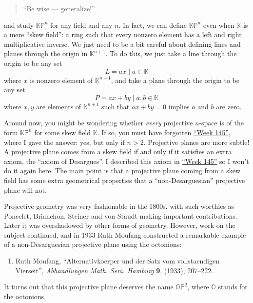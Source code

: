 \documentclass{article}
\def\tightlist{}
\begin{document}
\begin{quote}
``Be wise --- generalize!''
\end{quote}

and study \(\mathbb{KP}^n\) for any field and any \(n\). In fact, we can
define \(\mathbb{KP}^n\) even when \(\mathbb{K}\) is a mere ``skew
field'': a ring such that every nonzero element has a left and right
multiplicative inverse. We just need to be a bit careful about defining
lines and planes through the origin in \(\mathbb{K}^{n+1}\). To do this,
we just take a line through the origin to be any set
\[L = {ax \mid a\in\mathbb{K}}\] where \(x\) is nonzero element of
\(\mathbb{K}^{n+1}\), and take a plane through the origin to be any set
\[P = {ax + by \mid a,b\in\mathbb{K}}\] where \(x,y\) are elements of
\(\mathbb{K}^{n+1}\) such that \(ax + by = 0\) implies \(a\) and \(b\)
are zero.

Around now, you might be wondering whether \emph{every} projective
\(n\)-space is of the form \(\mathbb{KP}^n\) for some skew field
\(\mathbb{K}\). If so, you must have forgotten
\protect\hyperlink{week145}{``Week 145''}, where I gave the answer: yes,
but only if \(n>2\). Projective planes are more subtle! A projective
plane comes from a skew field if and only if it satisfies an extra
axiom, the ``axiom of Desargues''. I described this axiom in
\protect\hyperlink{week145}{``Week 145''} so I won't do it again here.
The main point is that a projective plane coming from a skew field has
some extra geometrical properties that a ``non-Desarguesian'' projective
plane will not.

Projective geometry was very fashionable in the 1800s, with such
worthies as Poncelet, Brianchon, Steiner and von Staudt making important
contributions. Later it was overshadowed by other forms of geometry.
However, work on the subject continued, and in 1933 Ruth Moufang
constructed a remarkable example of a non-Desarguesian projective plane
using the octonions:

\begin{enumerate}
\def\labelenumi{\arabic{enumi})}
\setcounter{enumi}{4}
\tightlist
\item
  Ruth Moufang, ``Alternativkoerper und der Satz vom vollstaendigen
  Vierseit'', \emph{Abhandlungen Math. Sem. Hamburg} \textbf{9}, (1933),
  207--222.
\end{enumerate}

It turns out that this projective plane deserves the name
\(\mathbb{OP}^2\), where \(\mathbb{O}\) stands for the octonions.
\end{document}

